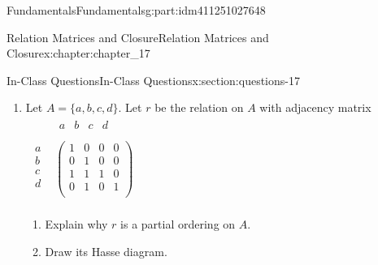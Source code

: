\documentclass[oneside,10pt,]{book}
\numberwithin{equation}{section}
\begin{document}
\begin{partptx}{Fundamentals}{}{Fundamentals}{}{}{g:part:idm411251027648}
\begin{chapterptx}{Relation Matrices and Closure}{}{Relation Matrices and Closure}{}{}{x:chapter:chapter_17}
\begin{sectionptx}{In-Class Questions}{}{In-Class Questions}{}{}{x:section:questions-17}
\begin{enumerate}[label=\arabic*.]
\begin{equation*}
\begin{array}{cc}
\begin{array}{c}
1 \\
2 \\
3 \\
\end{array}
& \left(
\begin{array}{cccccc}
0 & 1 & 1 & 0 & 0 & 1 \\
1 & 1 & 0 & 1 & 0 & 1 \\
0 & 1 & 0 & 0 & 1 & 1 \\
\end{array}
\right) \\
\end{array}
\end{equation*}
%
\par
%
\begin{enumerate}[label=(\alph*)]
\item{}compute \(S R\) using Boolean arithmetic and give an interpretation of the relation it defines, and%
\item{}compute \(S R\) using regular arithmetic and give an interpretation of what the result describes.%
\end{enumerate}
%
\item{}Let \(A = \{a, b, c, d\}\).  Let \(r\) be the relation on \(A\) with adjacency matrix \(\begin{array}{cc}
& 
\begin{array}{cccc}
a & b & c & d \\
\end{array}
\\
\begin{array}{c}
a \\
b \\
c \\
d \\
\end{array}
& \left(
\begin{array}{cccc}
1 & 0 & 0 & 0 \\
0 & 1 & 0 & 0 \\
1 & 1 & 1 & 0 \\
0 & 1 & 0 & 1 \\
\end{array}
\right) \\
\end{array}\)%
\par
%
\begin{enumerate}[label=(\alph*)]
\item{}Explain why \(r\) is a partial ordering on \(A\).%
\item{}Draw its Hasse diagram.%
\end{enumerate}

\end{enumerate}
\end{sectionptx}
\end{chapterptx}
\end{partptx}
\end{document}
